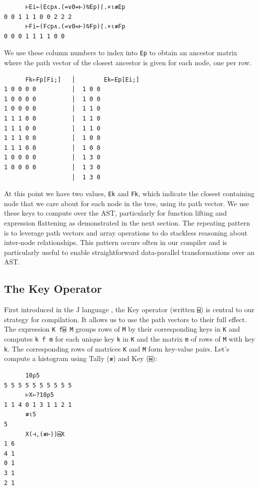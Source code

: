 ﻿\documentclass[numbers,10pt,preprint]{sigplanconf}
\begin{document}
\begin{verbatim}
      ⊢Ei←(Ecp∧.(=∨0=⊢)⍉Ep)⌈.×⍳≢Ep
0 0 1 1 1 0 0 2 2 2
      ⊢Fi←(Fcp∧.(=∨0=⊢)⍉Fp)⌈.×⍳≢Fp
0 0 0 1 1 1 1 0 0
\end{verbatim}

\noindent We use these column numbers to index into \verb;Ep; to obtain an ancestor matrix where the path vector of the closest ancestor is given for each node, one per row.

\begin{verbatim}
      Fk←Fp[Fi;]   │        Ek←Ep[Ei;]
1 0 0 0 0          │  1 0 0
1 0 0 0 0          │  1 0 0
1 0 0 0 0          │  1 1 0
1 1 1 0 0          │  1 1 0
1 1 1 0 0          │  1 1 0
1 1 1 0 0          │  1 0 0
1 1 1 0 0          │  1 0 0
1 0 0 0 0          │  1 3 0
1 0 0 0 0          │  1 3 0
                   │  1 3 0
\end{verbatim}

\noindent At this point we have two values, \verb;Ek; and \verb;Fk;, which indicate the closest containing node that we care about for each node in the tree, using its path vector. We use these keys to compute over the AST, particularly for function lifting and expression flattening as demonstrated in the next section. The repeating pattern is to leverage path vectors and array operations to do stackless reasoning about inter-node relationships. This pattern occurs often in our compiler and is particularly useful to enable straightforward data-parallel transformations over an AST.


\subsection{The Key Operator}

First introduced in the J language \cite{hui2014key}, the Key operator (written \verb;⌸;) is central to our strategy for compilation. It allows us to use the path vectors to their full effect. The expression \verb;K f⌸ M; groups rows of \verb;M; by their corresponding keys in \verb;K; and computes \verb;k f m; for each unique key \verb;k; in \verb;K; and the matrix \verb;m; of rows of \verb;M; with key \verb;k;. The corresponding rows of matrices \verb;K; and \verb;M; form key-value pairs. Let's compute a histogram using Tally (\verb;≢;) and Key (\verb;⌸;):

\begin{verbatim}
      10⍴5
5 5 5 5 5 5 5 5 5 5
      ⊢X←?10⍴5
1 1 4 0 1 3 1 1 2 1
      ≢⍳5
5
      X(⊣,(≢⊢))⌸X
1 6
4 1
0 1
3 1
2 1
\end{verbatim}
\end{document}
